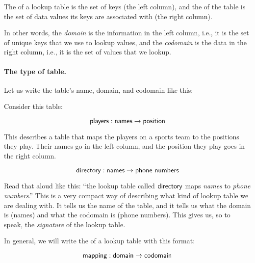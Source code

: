 \documentclass[../../../main.tex]{subfiles}
\begin{document}
\begin{terminology}
  The  of a lookup table is the set of keys (the left column), and the  of the table is the set of data values its keys are associated with (the right column).
\end{terminology}

In other words, the \emph{domain} is the information in the left column, i.e., it is the set of unique keys that we use to lookup values, and the \emph{codomain} is the data in the right column, i.e., it is the set of values that we lookup.

\paragraph{The type of table.} Let us write the table's name, domain, and codomain like this:

\begin{aside}
  \begin{example}
    Consider this table:
    
    \begin{equation*}
      \mathsf{players} : \mathsf{names} \rightarrow \mathsf{position}
    \end{equation*}
    
    This describes a table that maps the players on a sports team to the positions they play. Their names go in the left column, and the position they play goes in the right column.
  \end{example}
\end{aside} 

\begin{equation*}
  \mathsf{directory} : \mathsf{names} \rightarrow \mathsf{phone~numbers}
\end{equation*}

\noindent
Read that aloud like this: ``the lookup table called $\mathsf{directory}$ maps \emph{names} to \emph{phone numbers}.'' This is a very compact way of describing what kind of lookup table we are dealing with. It tells us the name of the table, and it tells us what the domain is (names) and what the codomain is (phone numbers). This gives us, so to speak, the \emph{signature} of the lookup table.

In general, we will write the  of a lookup table with this format:

\begin{equation*}
  \mathsf{mapping} : \mathsf{domain} \rightarrow \mathsf{codomain}
\end{equation*}
\end{document}
